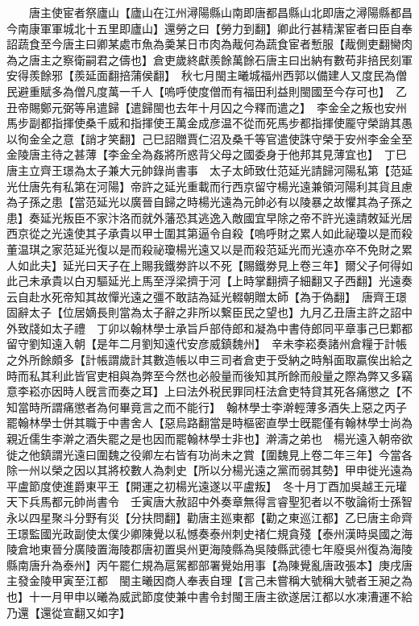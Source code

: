 　　唐主使宦者祭廬山【廬山在江州潯陽縣山南即唐都昌縣山北即唐之潯陽縣都昌今南康軍軍城北十五里即廬山】還勞之曰【勞力到翻】卿此行甚精潔宦者曰臣自奉詔蔬食至今唐主曰卿某處市魚為羮某日市肉為胾何為蔬食宦者慙服【胾側吏翻臠肉為之唐主之察衛嗣君之儔也】倉吏歲終獻羨餘萬餘石唐主曰出納有數苟非掊民刻軍安得羨餘邪【羨延面翻掊蒲侯翻】　秋七月閩主曦城福州西郭以備建人又度民為僧民避重賦多為僧凡度萬一千人【嗚呼使度僧而有福田利益則閩國至今存可也】　乙丑帝賜鄭元弼等帛遣歸【遣歸閩也去年十月囚之今釋而遣之】　李金全之叛也安州馬步副都指揮使桑千威和指揮使王萬金成彦温不從而死馬步都指揮使龎守榮誚其愚以徇金全之意【誚才笑翻】己巳詔贈賈仁沼及桑千等官遣使誅守榮于安州李金全至金陵唐主待之甚薄【李金全為姦將所惑背父母之國委身于他邦其見薄宜也】　丁巳唐主立齊王璟為太子兼大元帥錄尚書事　太子太師致仕范延光請歸河陽私第【范延光仕唐先有私第在河陽】帝許之延光重載而行西京留守楊光遠兼領河陽利其貨且慮為子孫之患【當范延光以廣晉自歸之時楊光遠為元帥必有以陵暴之故懼其為子孫之患】奏延光叛臣不家汴洛而就外藩恐其逃逸入敵國宜早除之帝不許光遠請敇延光居西京從之光遠使其子承貴以甲士圍其第逼令自殺【嗚呼財之累人如此祕瓊以是而殺董温琪之家范延光復以是而殺祕瓊楊光遠又以是而殺范延光而光遠亦卒不免財之累人如此夫】延光曰天子在上賜我鐵劵許以不死【賜鐵劵見上卷三年】爾父子何得如此己未承貴以白刃驅延光上馬至浮梁擠于河【上時掌翻擠子細翻又子西翻】光遠奏云自赴水死帝知其故憚光遠之彊不敢詰為延光輟朝贈太師【為于偽翻】　唐齊王璟固辭太子【位居嫡長則當為太子辭之非所以繋臣民之望也】九月乙丑唐主許之詔中外致牋如太子禮　丁卯以翰林學士承旨戶部侍郎和凝為中書侍郎同平章事己巳鄴都留守劉知遠入朝【是年二月劉知遠代安彦威鎮魏州】　辛未李崧奏諸州倉糧于計帳之外所餘頗多【計帳謂歲計其數造帳以申三司者倉吏于受納之時斛面取贏俟出給之時而私其利此皆官吏相與為弊至今然也必般量而後知其所餘而般量之際為弊又多竊意李崧亦因時人旣言而奏之耳】上曰法外税民罪同枉法倉吏特貸其死各痛懲之【不知當時所謂痛懲者為何畢竟言之而不能行】　翰林學士李澣輕薄多酒失上惡之丙子罷翰林學士併其職于中書舍人【惡烏路翻當是時樞密直學士旣罷僅有翰林學士尚為親近儒生李澣之酒失罷之是也因而罷翰林學士非也】澣濤之弟也　楊光遠入朝帝欲徙之他鎮謂光遠曰圍魏之役卿左右皆有功尚未之賞【圍魏見上卷二年三年】今當各除一州以榮之因以其將校數人為刺史【所以分楊光遠之黨而弱其勢】甲申徙光遠為平盧節度使進爵東平王【開運之初楊光遠遂以平盧叛】　冬十月丁酉加吳越王元瓘天下兵馬都元帥尚書令　壬寅唐大赦詔中外奏章無得言睿聖犯者以不敬論術士孫智永以四星聚斗分野有災【分扶問翻】勸唐主廵東都【勸之東巡江都】乙巳唐主命齊王璟監國光政副使太僕少卿陳覺以私憾奏泰州刺史禇仁規貪殘【泰州漢時吳國之海陵倉地東晉分廣陵置海陵郡唐初置吳州更海陵縣為吳陵縣武德七年廢吳州復為海陵縣南唐升為泰州】丙午罷仁規為扈駕都部署覺始用事【為陳覺亂唐政張本】庚戌唐主發金陵甲寅至江都　閩主曦因商人奉表自理【言己未嘗稱大號稱大號者王昶之為也】十一月甲申以曦為威武節度使兼中書令封閩王唐主欲遂居江都以水凍漕運不給乃還【還從宣翻又如字】

